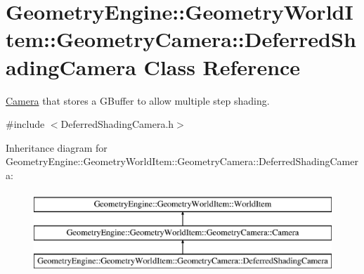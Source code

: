 \hypertarget{class_geometry_engine_1_1_geometry_world_item_1_1_geometry_camera_1_1_deferred_shading_camera}{}\section{Geometry\+Engine\+::Geometry\+World\+Item\+::Geometry\+Camera\+::Deferred\+Shading\+Camera Class Reference}
\label{class_geometry_engine_1_1_geometry_world_item_1_1_geometry_camera_1_1_deferred_shading_camera}


\mbox{\hyperlink{class_geometry_engine_1_1_geometry_world_item_1_1_geometry_camera_1_1_camera}{Camera}} that stores a G\+Buffer to allow multiple step shading.  




{\ttfamily \#include $<$Deferred\+Shading\+Camera.\+h$>$}

Inheritance diagram for Geometry\+Engine\+::Geometry\+World\+Item\+::Geometry\+Camera\+::Deferred\+Shading\+Camera\+:\begin{figure}[H]
\begin{center}
\leavevmode
\includegraphics[height=3.000000cm]{class_geometry_engine_1_1_geometry_world_item_1_1_geometry_camera_1_1_deferred_shading_camera}
\end{center}
\end{figure}
